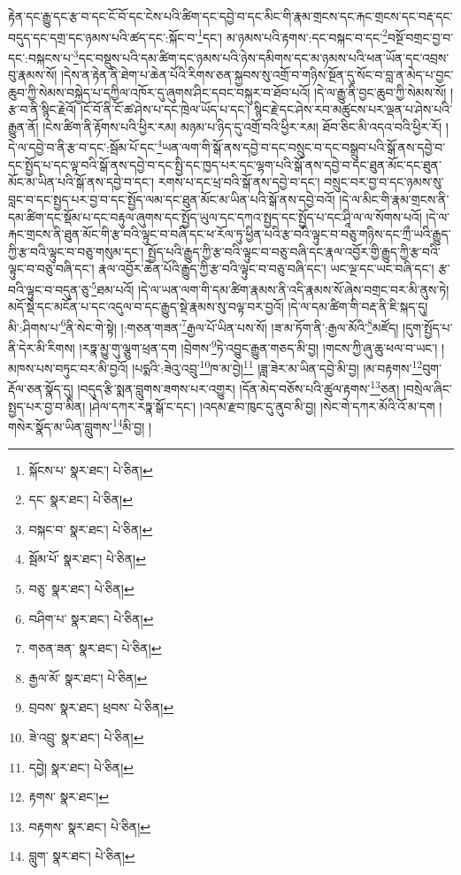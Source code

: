 རྟེན་དང་རྒྱུ་དང་རྩ་བ་དང་ངོ་བོ་དང་ངེས་པའི་ཚིག་དང་དབྱེ་བ་དང་མིང་གི་རྣམ་གྲངས་དང་རྐང་གྲངས་དང་བརྡ་དང་བདུད་དང་དགྲ་དང་ཉམས་པའི་ཚད་དང་:སྐོང་བ་\footnote{སྐོངས་པ་  སྣར་ཐང་།  པེ་ཅིན། }དང་། མ་ཉམས་པའི་རྟགས་:དང་བསྐང་བ་དང་\footnote{དང་  སྣར་ཐང་།  པེ་ཅིན། }བསྔོ་བགྲང་བྱ་བ་དང་:བསྐངས་པ་\footnote{བསྐང་བ་  སྣར་ཐང་།  པེ་ཅིན། }དང་བསྡུས་པའི་དམ་ཚིག་དང་ཉམས་པའི་ཉེས་དམིགས་དང་མ་ཉམས་པའི་ཕན་ཡོན་དང་འབྲས་བུ་རྣམས་སོ། །དེས་ན་རྟེན་ནི་ཐེག་པ་ཆེན་པོའི་རིགས་ཅན་སྐྱབས་སུ་འགྲོ་བ་གཉིས་སྔོན་དུ་སོང་བ་བླ་ན་མེད་པ་བྱང་ཆུབ་ཀྱི་སེམས་བསྐྱེད་པ་དཀྱིལ་འཁོར་དུ་ཞུགས་ཤིང་དབང་བསྐུར་བ་ཐོབ་པའོ། །དེ་ལ་རྒྱུ་ནི་བྱང་ཆུབ་ཀྱི་སེམས་སོ། །རྩ་བ་ནི་སྙིང་རྗེའོ། །ངོ་བོ་ནི་ངོ་ཚ་ཤེས་པ་དང་ཁྲེལ་ཡོད་པ་དང་། སྙིང་རྗེ་དང་ཤེས་རབ་མཚུངས་པར་ལྡན་པ་ཤེས་པའི་རྒྱུན་ནོ། །ངེས་ཚིག་ནི་རྟོགས་པའི་ཕྱིར་རམ། མཉམ་པ་ཉིད་དུ་འགྲོ་བའི་ཕྱིར་རམ། ཐོབ་ཅིང་མི་འདའ་བའི་ཕྱིར་རོ། །དེ་ལ་དབྱེ་བ་ནི་རྩ་བ་དང་:སྦོམ་པོ་དང་\footnote{སྦོམ་པོ་  སྣར་ཐང་།  པེ་ཅིན། }ཡན་ལག་གི་སྒོ་ནས་དབྱེ་བ་དང་བསྲུང་བ་དང་བསྒྲུབ་པའི་སྒོ་ནས་དབྱེ་བ་དང་སྤྱོད་པ་དང་ལྟ་བའི་སྒོ་ནས་དབྱེ་བ་དང་སྤྱི་དང་ཁྱད་པར་དང་ལྷག་པའི་སྒོ་ནས་དབྱེ་བ་དང་ཐུན་མོང་དང་ཐུན་མོང་མ་ཡིན་པའི་སྒོ་ནས་དབྱེ་བ་དང་། རགས་པ་དང་ཕྲ་བའི་སྒོ་ནས་དབྱེ་བ་དང་། བསྲུང་བར་བྱ་བ་དང་ཉམས་སུ་བླང་བ་དང་སྤྱད་པར་བྱ་བ་དང་སྤྱོད་ལམ་དང་ཐུན་མོང་མ་ཡིན་པའི་སྒོ་ནས་དབྱེ་བའོ། །དེ་ལ་མིང་གི་རྣམ་གྲངས་ནི་དམ་ཚིག་དང་སྡོམ་པ་དང་བརྟུལ་ཞུགས་དང་སྤྱོད་ཡུལ་དང་དཀའ་སྤྱད་དང་སྤྱོད་པ་དང་ཤཱི་ལ་ལ་སོགས་པའོ། །དེ་ལ་རྐང་གྲངས་ནི་ཐུན་མོང་གི་རྩ་བའི་ལྟུང་བ་བཞི་དང་ཕ་རོལ་ཏུ་ཕྱིན་པའི་རྩ་བའི་ལྟུང་བ་བཅུ་གཉིས་དང་ཀྲྀ་ཡའི་རྒྱུད་ཀྱི་རྩ་བའི་ལྟུང་བ་བཅུ་གསུམ་དང་། སྤྱོད་པའི་རྒྱུད་ཀྱི་རྩ་བའི་ལྟུང་བ་བཅུ་བཞི་དང་རྣལ་འབྱོར་གྱི་རྒྱུད་ཀྱི་རྩ་བའི་ལྟུང་བ་བཅུ་བཞི་དང་། རྣལ་འབྱོར་ཆེན་པོའི་རྒྱུད་ཀྱི་རྩ་བའི་ལྟུང་བ་བཅུ་བཞི་དང་། ཡང་ལྔ་དང་ཡང་བཞི་དང་། རྩ་བའི་ལྟུང་བ་བདུན་ཅུ་\footnote{བཅུ་  སྣར་ཐང་།  པེ་ཅིན། }ཐམ་པའོ། །དེ་ལ་ཡན་ལག་གི་དམ་ཚིག་རྣམས་ནི་འདི་རྣམས་སོ་ཞེས་བགྲང་བར་མི་ནུས་ཏེ། མདོ་སྡེ་དང་མངོན་པ་དང་འདུལ་བ་དང་རྒྱུད་སྡེ་རྣམས་སུ་བལྟ་བར་བྱའོ། །དེ་ལ་དམ་ཚིག་གི་བརྡ་ནི་ཇི་སྐད་དུ། མི་:ཤིགས་པ་\footnote{བཤིག་པ་  སྣར་ཐང་།  པེ་ཅིན། }ནི་སེང་གེ་སྟེ། །:གཅན་གཟན་\footnote{གཅན་ཟན་  སྣར་ཐང་།  པེ་ཅིན། }རྒྱལ་པོ་ཡིན་པས་སོ། །ཟ་མ་ཏོག་ནི་:རྒྱལ་མོའི་\footnote{རྒྱལ་མོ་  སྣར་ཐང་།  པེ་ཅིན། }མཛོད། །དུག་སྤྱོད་པ་ནི་དེར་མི་རིགས། །རཏྣ་མྱུ་གུ་ལྕུག་ཕྲན་དག །བྲེགས་\footnote{བྲབས་  སྣར་ཐང་། ཕྲབས་  པེ་ཅིན། }ཏེ་འབྱུང་རྒྱུན་གཅད་མི་བྱ། །གངས་ཀྱི་ཞུ་ཆུ་ཕལ་བ་ཡང་། །མཁས་པས་བཏུང་བར་མི་བྱའོ། །པདྨའི་:ཟེའུ་འབྲུ་\footnote{ཟེ་འབྲུ་  སྣར་ཐང་།  པེ་ཅིན། }ཁ་མ་བྱེ།\footnote{དབྱེ།  སྣར་ཐང་།  པེ་ཅིན། } །ཟླ་ཟེར་མ་ཡིན་དབྱེ་མི་བྱ། །མ་བརྟགས་\footnote{རྟགས་  སྣར་ཐང་། }བུག་རྡོལ་ཅན་སྣོད་དུ། །བདུད་རྩི་སྨན་བླུགས་ཟགས་པར་འགྱུར། །དོན་མེད་བཅོས་པའི་ཚུལ་རྟགས་\footnote{བརྟགས་  སྣར་ཐང་།  པེ་ཅིན། }ཅན། །བསྲེལ་ཞིང་སྤྱད་པར་བྱ་བ་མིན། །ཤེལ་དཀར་རཏྣ་སྒོ་ང་དང་། །འདམ་རྫབ་ཁུང་དུ་ནུབ་མི་བྱ། །སེང་གེ་དཀར་མོའི་འོ་མ་དག །གསེར་སྣོད་མ་ཡིན་བླུགས་\footnote{བླུག་  སྣར་ཐང་།  པེ་ཅིན། }མི་བྱ། །
